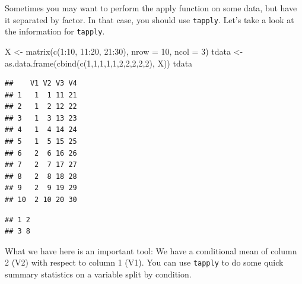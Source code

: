 \documentclass[
]{book}
\newenvironment{Shaded}{\begin{snugshade}}{\end{snugshade}}
\newcommand{\AttributeTok}[1]{\textcolor[rgb]{0.77,0.63,0.00}{#1}}
\newcommand{\ControlFlowTok}[1]{\textcolor[rgb]{0.13,0.29,0.53}{\textbf{#1}}}
\newcommand{\DecValTok}[1]{\textcolor[rgb]{0.00,0.00,0.81}{#1}}
\newcommand{\FunctionTok}[1]{\textcolor[rgb]{0.00,0.00,0.00}{#1}}
\newcommand{\NormalTok}[1]{#1}
\newcommand{\OtherTok}[1]{\textcolor[rgb]{0.56,0.35,0.01}{#1}}
\newcommand{\SpecialCharTok}[1]{\textcolor[rgb]{0.00,0.00,0.00}{#1}}
\begin{document}
Sometimes you may want to perform the apply function on some data, but have it separated by factor. In that case, you should use \texttt{tapply}. Let's take a look at the information for \texttt{tapply}.

\begin{Shaded}
\begin{Highlighting}[]
\NormalTok{X }\OtherTok{\textless{}{-}} \FunctionTok{matrix}\NormalTok{(}\FunctionTok{c}\NormalTok{(}\DecValTok{1}\SpecialCharTok{:}\DecValTok{10}\NormalTok{, }\DecValTok{11}\SpecialCharTok{:}\DecValTok{20}\NormalTok{, }\DecValTok{21}\SpecialCharTok{:}\DecValTok{30}\NormalTok{), }\AttributeTok{nrow =} \DecValTok{10}\NormalTok{, }\AttributeTok{ncol =} \DecValTok{3}\NormalTok{)}
\NormalTok{tdata }\OtherTok{\textless{}{-}} \FunctionTok{as.data.frame}\NormalTok{(}\FunctionTok{cbind}\NormalTok{(}\FunctionTok{c}\NormalTok{(}\DecValTok{1}\NormalTok{,}\DecValTok{1}\NormalTok{,}\DecValTok{1}\NormalTok{,}\DecValTok{1}\NormalTok{,}\DecValTok{1}\NormalTok{,}\DecValTok{2}\NormalTok{,}\DecValTok{2}\NormalTok{,}\DecValTok{2}\NormalTok{,}\DecValTok{2}\NormalTok{,}\DecValTok{2}\NormalTok{), X))}
\NormalTok{tdata}
\end{Highlighting}
\end{Shaded}

\begin{verbatim}
##    V1 V2 V3 V4
## 1   1  1 11 21
## 2   1  2 12 22
## 3   1  3 13 23
## 4   1  4 14 24
## 5   1  5 15 25
## 6   2  6 16 26
## 7   2  7 17 27
## 8   2  8 18 28
## 9   2  9 19 29
## 10  2 10 20 30
\end{verbatim}

\begin{Shaded}
\end{Shaded}

\begin{verbatim}
## 1 2 
## 3 8
\end{verbatim}

What we have here is an important tool: We have a conditional mean of column 2 (V2) with respect to column 1 (V1). You can use \texttt{tapply} to do some quick summary statistics on a variable split by condition.

\begin{Shaded}
\end{Shaded}
\end{document}
